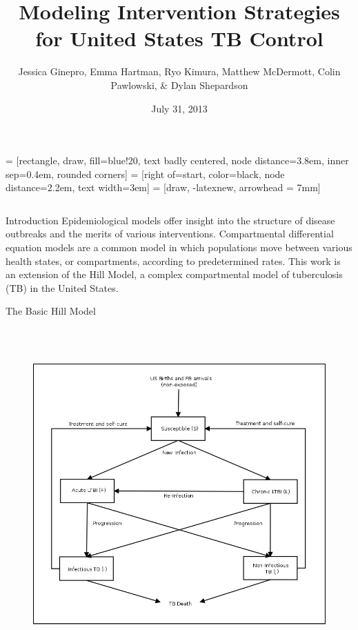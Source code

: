 \documentclass[final]{beamer}
\title{\huge Modeling Intervention Strategies for United States TB Control}
\author{Jessica Ginepro, Emma Hartman, Ryo Kimura, Matthew McDermott, Colin
        Pawlowski, \& Dylan Shepardson}
\institute[MHC]{Mathematical Modeling Group, Mount Holyoke College, South
                Hadley, MA, USA}
\date[July 31, 2013]{July 31, 2013}
\begin{document}
 = [rectangle, draw, fill=blue!20, text badly centered,
  node distance=3.8em, inner sep=0.4em, rounded corners]
 = [right of=start, color=black, node distance=2.2em,
text width=3em]
 = [draw, -latexnew, arrowhead = 7mm]


\begin{frame}
  \begin{columns}
    \begin{column}{.3\textwidth}
      \begin{block}{Introduction}
        Epidemiological models offer insight into the structure of disease outbreaks and the merits of various interventions.  Compartmental differential equation models are a common model in which populations move between various health states, or compartments, according to predetermined rates.  This work is an extension of the Hill Model, a complex compartmental model of tuberculosis (TB) in the United States.
      \end{block}
      \begin{block}{The Basic Hill Model}
        \begin{columns}[T]
          \begin{column}{.5\textwidth}
            \begin{figure}[h]
              \begin{center}
                \includegraphics[height=12cm,width=.9\textwidth]{HillModelFlowChart}

\end{center}
\end{figure}
\end{column}
\end{columns}
\end{block}
\end{column}
\end{columns}
\end{frame}
\end{document}
